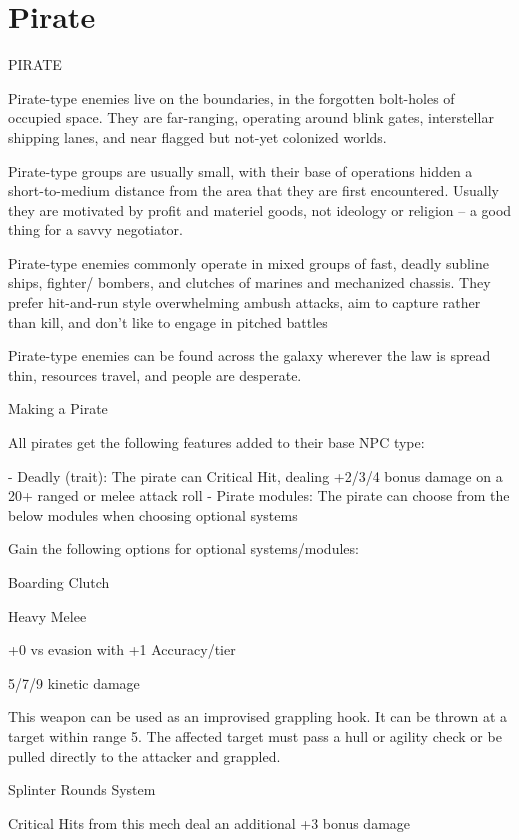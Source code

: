 \section{Pirate}

                                                   PIRATE  

Pirate-type enemies live on the boundaries, in the forgotten bolt-holes of occupied space. They  
are far-ranging, operating around blink gates, interstellar shipping lanes, and near flagged but  
not-yet colonized worlds.   

Pirate-type groups are usually small, with their base of operations hidden a short-to-medium  
distance from the area that they are first encountered. Usually they are motivated by profit and  
materiel goods, not ideology or religion -- a good thing for a savvy negotiator.    

Pirate-type enemies commonly operate in mixed groups of fast, deadly subline ships, fighter/ 
bombers, and clutches of marines and mechanized chassis. They prefer hit-and-run style  
overwhelming ambush attacks, aim to capture rather than kill, and don’t like to engage in pitched  
battles  
 

Pirate-type enemies can be found across the galaxy wherever the law is spread thin, resources  
travel, and people are desperate.   

Making a Pirate
 
All pirates get the following features added to their base NPC type:
 
    -    Deadly (trait): The pirate can Critical Hit, dealing +2/3/4 bonus damage on a 20+ ranged  
         or melee attack roll  
    -    Pirate modules: The pirate can choose from the below modules when choosing optional  
         systems  

Gain the following options for optional systems/modules:
 

Boarding Clutch
 
Heavy Melee
 
+0 vs evasion with +1 Accuracy/tier
 
5/7/9 kinetic damage
 
This weapon can be used as an improvised grappling hook. It can be thrown at a target within  
range 5. The affected target must pass a hull or agility check or be pulled directly to the attacker  
and grappled.
 

Splinter Rounds  
System
 
Critical Hits from this mech deal an additional +3 bonus damage
 

